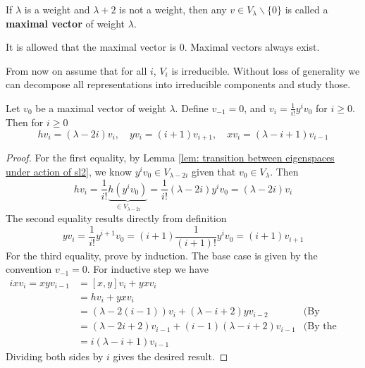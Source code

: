 \documentclass{article}
\begin{document}
\begin{definition}
    If $\lambda$ is a weight and $\lambda + 2$ is not a weight, then any $v \in V_{\lambda} \smallsetminus \{0\}$ is called a \textbf{maximal vector} of weight $\lambda$.
\end{definition}
\nogap
\begin{remark}
    It is allowed that the maximal vector is 0. Maximal vectors always exist.
\end{remark}

\textstart
From now on assume that for all $i$, $V_i$ is irreducible. Without loss of generality we can decompose all representations into irreducible components and study those.

\begin{lemma}\label{lem: sl2 action on maximal vector}
    Let $v_0$ be a maximal vector of weight $\lambda$. Define $v_{-1} = 0$, and $v_i = \frac{1}{i!} y^i v_0$ for $i \geq 0$. Then for $i \geq 0$
    \[
        h v_i = (\lambda - 2i) v_i, \quad y v_i = (i + 1) v_{i+1}, \quad x v_i = (\lambda - i + 1) v_{i-1}
    \]
\end{lemma}

\begin{proof}
    For the first equality, by Lemma \ref{lem: transition between eigenspaces under action of sl2}, we know $y^i v_0 \in V_{\lambda - 2i}$ given that $v_0 \in V_{\lambda}$. Then
    \[
        h v_i = \frac{1}{i!} \underbrace{h(y^i v_0)}_{\in V_{\lambda - 2i}} = \frac{1}{i!} (\lambda - 2i) y^i v_0 = (\lambda - 2i) v_i
    \]
    The second equality results directly from definition
    \[
        y v_i = \frac{1}{i!} y^{i+1} v_0 = (i+1) \frac{1}{(i+1)!} y^i v_0 = (i+1) v_{i+1}
    \]
    For the third equality, prove by induction. The base case is given by the convention $v_{-1} = 0$. For inductive step we have
    \begin{align*}
        ix v_i = xyv_{i-1}
        & = [x, y] v_i + yxv_i \\
        & = hv_i + yxv_i \\
        & = (\lambda - 2(i-1)) v_i + (\lambda - i + 2) y v_{i-2} & \text{(By induction and the first equality)} \\
        & = (\lambda - 2i + 2) v_{i-1} + (i - 1)(\lambda - i + 2) v_{i-1} & \text{(By the second equality)} \\
        & = i (\lambda - i + 1) v_{i-1}
    \end{align*}
    Dividing both sides by $i$ gives the desired result.
\end{proof}
\end{document}
